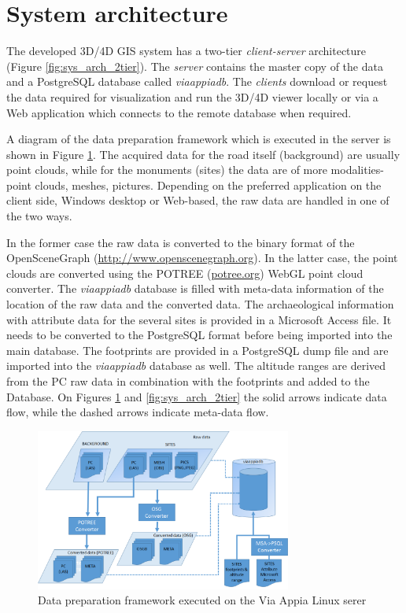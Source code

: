 \section{System architecture}
\label{sec:sys_arch}

The developed 3D/4D GIS system has a two-tier {\em client-server} architecture (Figure \ref{fig:sys_arch_2tier}). The {\em server} contains the master copy of the data and a PostgreSQL database called \textit{viaappiadb}. The {\em clients} download or request the data required for visualization and run the 3D/4D viewer locally or via a Web application which connects to the remote database when required.
 
A diagram of the data preparation framework which is executed in the server is shown in Figure \ref{fig:sys_arch_data_framework}. The acquired data for the road itself (background) are usually point clouds, while for the monuments (sites) the data are of more modalities- point clouds, meshes, pictures. Depending on the preferred application on the client side, Windows desktop or Web-based, the raw data are handled in one of the two ways. 

In the former case the raw data is converted to the binary format of the OpenSceneGraph (\url{http://www.openscenegraph.org}). In the latter case, the point clouds are converted using the POTREE (\url{potree.org}) WebGL point cloud converter. The \textit{viaappiadb} database is filled with meta-data information of the location of the raw data and the converted data. The archaeological information with attribute data for the several sites is provided in a Microsoft Access file. It needs to be converted to the PostgreSQL format before being imported into the main database. The footprints are provided in a PostgreSQL dump file and are imported into the \textit{viaappiadb} database as well. The altitude ranges are derived from the PC raw data in combination with the footprints and added to the Database. On Figures \ref{fig:sys_arch_data_framework} and \ref{fig:sys_arch_2tier} the solid arrows indicate data flow, while the dashed arrows indicate meta-data flow.

\begin{figure}[H]
 \centering
 \includegraphics[width=0.75\textwidth]{fig/system_architecture/DataFramework.pdf}
 \caption{Data preparation framework executed on the Via Appia Linux serer}
 \label{fig:sys_arch_data_framework}
\end{figure}

